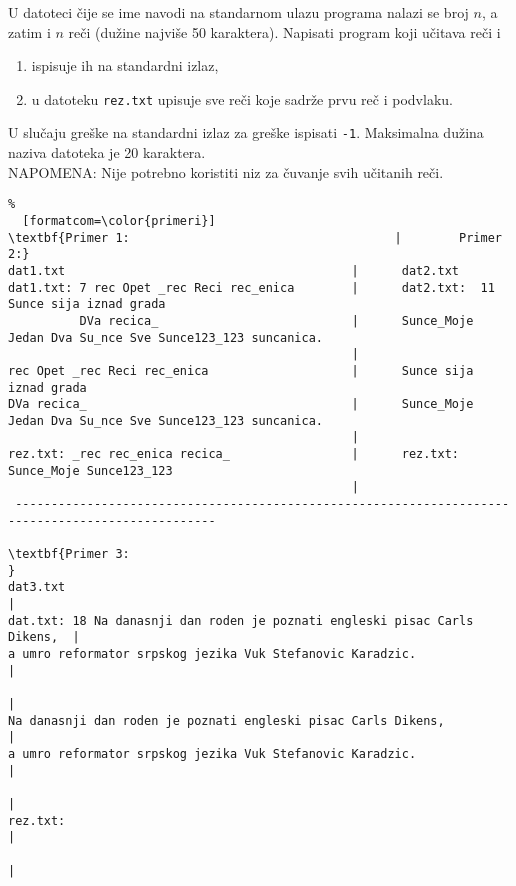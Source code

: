 \documentclass{article}
\begin{document}
\begin{z}
U datoteci \v cije se ime navodi na standarnom ulazu
  programa nalazi se broj $n$, a zatim i $n$ re\v ci (du\v zine
  najvi\v se 50 karaktera). Napisati program koji u\v citava reči 
  i
  \begin{enumerate}
  \item ispisuje ih na standardni izlaz,
  \item u datoteku \verb|rez.txt| upisuje sve re\v ci koje sadr\v ze
    prvu re\v c i podvlaku.
  \end{enumerate}
  U slučaju greške na standardni izlaz za greške ispisati {\tt -1}.  Maksimalna du\v zina naziva datoteka je 20 karaktera. \\
NAPOMENA: Nije potrebno koristiti niz za čuvanje svih učitanih reči. 
\end{z}

\begin{Verbatim}%
  [formatcom=\color{primeri}]  
\textbf{Primer 1:                                     |        Primer 2:}
dat1.txt                                        |      dat2.txt
dat1.txt: 7 rec Opet _rec Reci rec_enica        |      dat2.txt:  11 Sunce sija iznad grada  
          DVa recica_                           |      Sunce_Moje Jedan Dva Su_nce Sve Sunce123_123 suncanica.
                                                |        
rec Opet _rec Reci rec_enica                    |      Sunce sija iznad grada
DVa recica_                                     |      Sunce_Moje Jedan Dva Su_nce Sve Sunce123_123 suncanica.
                                                |        
rez.txt: _rec rec_enica recica_                 |      rez.txt: Sunce_Moje Sunce123_123
                                                |
 --------------------------------------------------------------------------------------------------

\textbf{Primer 3:                                                                  }
dat3.txt                                                                   |      
dat.txt: 18 Na danasnji dan roden je poznati engleski pisac Carls Dikens,  |       
a umro reformator srpskog jezika Vuk Stefanovic Karadzic.                  |     
                                                                           |
Na danasnji dan roden je poznati engleski pisac Carls Dikens,              |
a umro reformator srpskog jezika Vuk Stefanovic Karadzic.                  |
                                                                           |
rez.txt:                                                                   |
                                                                           |
\end{Verbatim}
\end{document}
